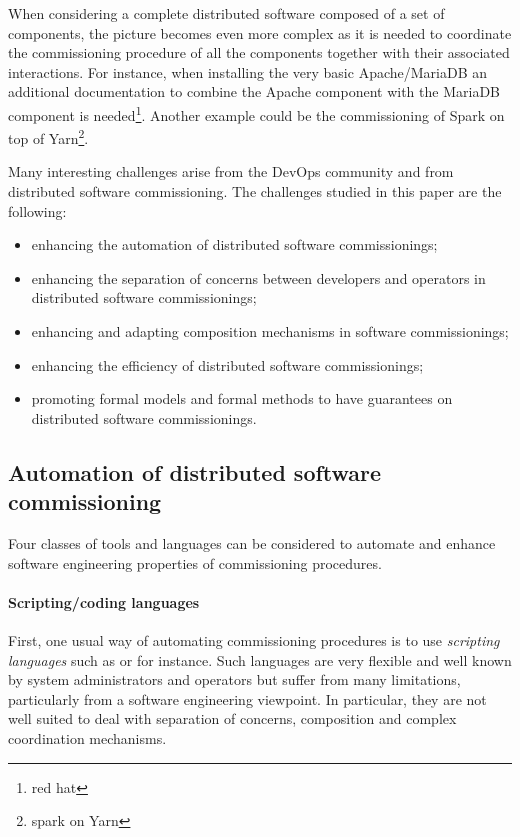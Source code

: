 When considering a complete distributed software composed of a set of
components, the picture becomes even more complex as it is needed to
coordinate the commissioning procedure of all the components together
with their associated interactions. For instance, when installing the
very basic Apache/MariaDB an additional documentation to combine the
Apache component with the MariaDB component is needed\footnote{red
  hat}. Another example could be the commissioning of Spark on top of
Yarn\footnote{spark on Yarn}.

Many interesting challenges arise from the DevOps community and from
distributed software commissioning. The challenges studied in this
paper are the following:
\begin{itemize}
\item enhancing the automation of distributed software commissionings;
\item enhancing the separation of concerns between developers and
  operators in distributed software commissionings;
\item enhancing and adapting composition mechanisms in software
  commissionings;
\item enhancing the efficiency of distributed software commissionings;
\item promoting formal models and formal methods to have guarantees on
  distributed software commissionings.
\end{itemize}

\subsection{Automation of distributed software commissioning}

Four classes of tools and languages can be considered to automate and
enhance software engineering properties of commissioning procedures.

\paragraph{Scripting/coding languages}
First, one usual way of automating commissioning procedures is to use
\emph{scripting languages} such as \shell or \ruby for instance. Such
languages are very flexible and well known by system administrators
and operators but suffer from many limitations, particularly from a
software engineering viewpoint. In particular, they are not well
suited to deal with separation of concerns, composition and complex
coordination mechanisms.

